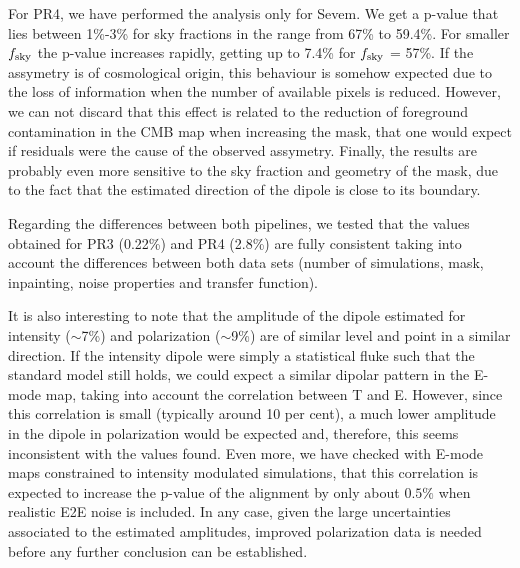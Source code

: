 For PR4, we have performed the analysis only for Sevem. We get a p-value that lies between 1\%-3\% for sky fractions in the range from 67\% to 59.4\%. For smaller $f_{\rm sky}$ the p-value increases rapidly, getting up to 7.4\% for $f_{\rm sky}$ = 57\%. If the assymetry is of cosmological origin, this behaviour is somehow expected due to the loss of information when the number of available pixels is reduced. 
However, we can not discard that this effect is related to the reduction of foreground contamination in the CMB map when increasing the mask, that one would expect if residuals were the cause of the observed assymetry. Finally, the results are probably even more sensitive to the sky fraction and geometry of the mask, due to the fact that the estimated direction of the dipole is close to its boundary.

Regarding the differences between both pipelines, 
we tested that the values obtained for PR3 (0.22\%) and PR4 (2.8\%) are fully consistent taking into account the differences between both data sets (number of simulations, mask, inpainting, noise properties and transfer function).

It is also interesting to note that the amplitude of the dipole estimated for intensity ($\sim$7\%) and polarization ($\sim$9\%) are of similar level and point in a similar direction. If the intensity dipole were simply a statistical fluke such that the standard model still holds, we could expect a similar dipolar pattern in the E-mode map, taking into account the correlation between T and E. 
However, since this correlation is small (typically around 10 per cent), a much lower amplitude in the dipole in polarization would be expected and, therefore, this seems inconsistent with the values found. Even more, we have checked with E-mode maps constrained to intensity modulated simulations, that this correlation is expected to increase the p-value of the alignment by only about $0.5\%$ when realistic E2E noise is included. In any case, given the large uncertainties associated to the estimated amplitudes, improved polarization data is needed before any further conclusion can be established.

